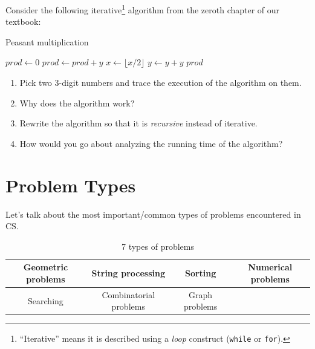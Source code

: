 \documentclass[12pt]{article}
\begin{document}
Consider the following iterative\footnote{``Iterative'' means it is described using a \emph{loop} construct (\texttt{while} or \texttt{for}).} algorithm from the zeroth chapter of our textbook:

\begin{algorithm}
    \caption{Peasant multiplication}
    \label{alg:peasant}
    \begin{algorithmic}
        \State $prod \gets 0$
                \State $prod \gets prod + y$
            \EndIf
            \State $x \gets \lfloor{x / 2}\rfloor$
            \State $y \gets y + y$
        \EndWhile
        \State \Return $prod$
        \EndProcedure
    \end{algorithmic}
\end{algorithm}

\begin{enumerate}
    \item Pick two 3-digit numbers and trace the execution of the algorithm on them.
    \item Why does the algorithm work?
    \item Rewrite the algorithm so that it is \emph{recursive} instead of iterative.
    \item How would you go about analyzing the running time of the algorithm?
\end{enumerate}



\clearpage
\section{Problem Types}

Let's talk about the most important/common types of problems encountered in CS.

\begin{table}[h]
    \caption{7 types of problems}
    \begin{tabular}{|c|c|c|c|}
        \hline
        Geometric problems & String processing & Sorting & Numerical problems \\
        \hline
        Searching & Combinatorial problems & Graph problems & \\
        \hline
    \end{tabular}
\end{table}
\end{document}
